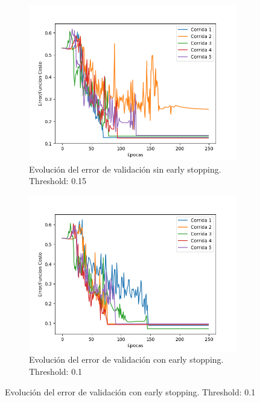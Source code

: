 \begin{figure}[!htbp]
\centering
\begin{subfigure}{.5\textwidth}
  \centering
  \includegraphics[width=1\linewidth]{graficos/early_stopping_validacion_0_15.png}
  \caption{Evolución del error de validación sin early stopping. Threshold: 0.15}
  \label{fig:sub1}
\end{subfigure}%
\begin{subfigure}{.5\textwidth}
  \centering
  \includegraphics[width=1\linewidth]{graficos/early_stopping_validacion_0_1.png}
  \caption{Evolución del error de validación con early stopping. Threshold: 0.1}
  \label{fig:sub2}
\end{subfigure}
\end{figure}


